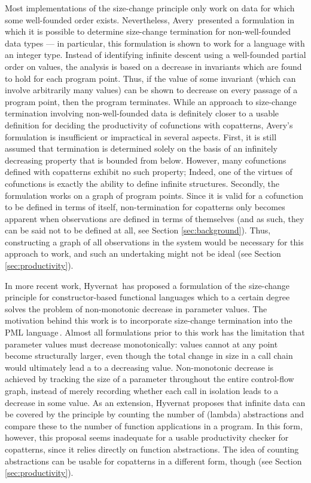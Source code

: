 Most implementations of the size-change principle only work on data for which some well-founded order exists. Nevertheless, Avery\,\citep{Avery06} presented a formulation in which it is possible to determine size-change termination for non-well-founded data types --- in particular, this formulation is shown to work for a language with an integer type. Instead of identifying infinite descent using a well-founded partial order on values, the analysis is based on a decrease in invariants which are found to hold for each program point. Thus, if the value of some invariant (which can involve arbitrarily many values) can be shown to decrease on every passage of a program point, then the program terminates. While an approach to size-change termination involving non-well-founded data is definitely closer to a usable definition for deciding the productivity of cofunctions with copatterns, Avery's formulation is insufficient or impractical in several aspects. First, it is still assumed that termination is determined solely on the basis of an infinitely decreasing property that is bounded from below. However, many cofunctions defined with copatterns exhibit no such property; Indeed, one of the virtues of cofunctions is exactly the ability to define infinite structures. Secondly, the formulation works on a graph of program points. Since it is valid for a cofunction to be defined in terms of itself, non-termination for copatterns only becomes apparent when observations are defined in terms of themselves (and as such, they can be said not to be defined at all, see Section \ref{sec:background}). Thus, constructing a graph of all observations in the system would be necessary for this approach to work, and such an undertaking might not be ideal (see Section \ref{sec:productivity}).

In more recent work, Hyvernat\,\citep{Hyvernat13} has proposed a formulation of the size-change principle for constructor-based functional languages which to a certain degree solves the problem of non-monotonic decrease in parameter values. The motivation behind this work is to incorporate size-change termination into the PML language\,\cite{PMLLanguage}. Almost all formulations prior to this work has the limitation that parameter values must decrease monotonically: values cannot at any point become structurally larger, even though the total change in size in a call chain would ultimately lead a to a decreasing value. Non-monotonic decrease is achieved by tracking the size of a parameter throughout the entire control-flow graph, instead of merely recording whether each call in isolation leads to a decrease in some value. As an extension, Hyvernat proposes that infinite data can be covered by the principle by counting the number of (lambda) abstractions and compare these to the number of function applications in a program. In this form, however, this proposal seems inadequate for a usable productivity checker for copatterns, since it relies directly on function abstractions. The idea of counting abstractions can be usable for copatterns in a different form, though (see Section \ref{sec:productivity}).

